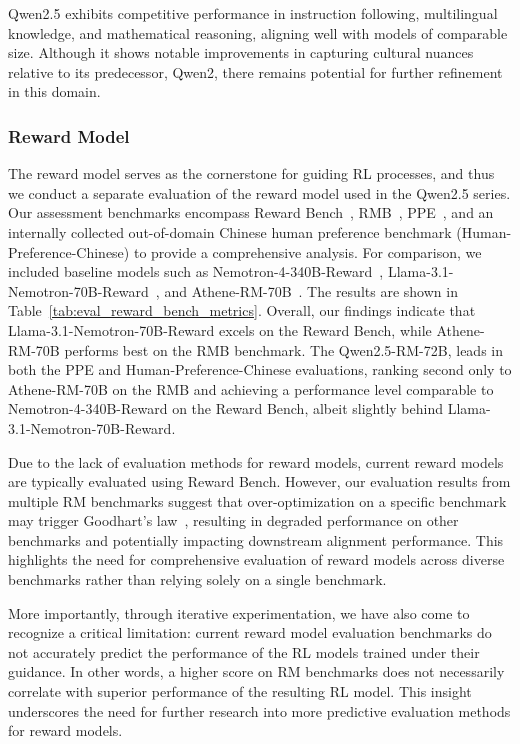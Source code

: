 Qwen2.5 exhibits competitive performance in instruction following, multilingual knowledge, and mathematical reasoning, aligning well with models of comparable size. Although it shows notable improvements in capturing cultural nuances relative to its predecessor, Qwen2, there remains potential for further refinement in this domain.



\subsubsection{Reward Model}

The reward model serves as the cornerstone for guiding RL processes, and thus we conduct a separate evaluation of the reward model used in the Qwen2.5 series. Our assessment benchmarks encompass Reward Bench~\citep{Lambert2024RewardBenchER}, RMB~\citep{Zhou2024RMBCB}, PPE~\citep{Frick2024HowTE}, and an internally collected out-of-domain Chinese human preference benchmark (Human-Preference-Chinese) to provide a comprehensive analysis.
For comparison, we included baseline models such as Nemotron-4-340B-Reward~\citep{Adler2024Nemotron43T}, Llama-3.1-Nemotron-70B-Reward~\citep{Wang2024HelpSteer2PreferenceCR}, and Athene-RM-70B~\citep{Athene2024}. The results are shown in Table~\ref{tab:eval_reward_bench_metrics}. Overall, our findings indicate that Llama-3.1-Nemotron-70B-Reward excels on the Reward Bench, while Athene-RM-70B performs best on the RMB benchmark. The Qwen2.5-RM-72B, leads in both the PPE and Human-Preference-Chinese evaluations, ranking second only to Athene-RM-70B on the RMB and achieving a performance level comparable to Nemotron-4-340B-Reward on the Reward Bench, albeit slightly behind Llama-3.1-Nemotron-70B-Reward.

Due to the lack of evaluation methods for reward models, current reward models are typically evaluated using Reward Bench. However, our evaluation results from multiple RM benchmarks suggest that over-optimization on a specific benchmark may trigger Goodhart's law~\citep{hoskin1996}, resulting in degraded performance on other benchmarks and potentially impacting downstream alignment performance. This highlights the need for comprehensive evaluation of reward models across diverse benchmarks rather than relying solely on a single benchmark.

More importantly, through iterative experimentation, we have also come to recognize a critical limitation: current reward model evaluation benchmarks do not accurately predict the performance of the RL models trained under their guidance. In other words, a higher score on RM benchmarks does not necessarily correlate with superior performance of the resulting RL model. This insight underscores the need for further research into more predictive evaluation methods for reward models.


